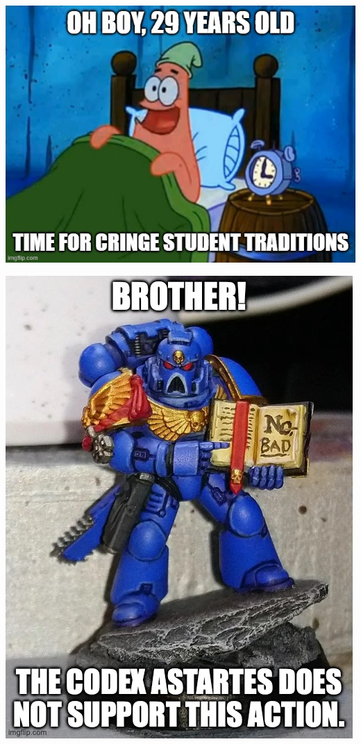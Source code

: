 \documentclass{article}
\title{\vspace{40em}\textbf{\color{white}\Huge{}}}
\date{\vspace{-3em}\color{white}}
\author{}
\begin{document}
\customtitle
\BgThispage
\clearpage

\newpage

\sffamily


\vfill
\includegraphics[width=0.9\linewidth]{images/memes/ohboy.jpg}

\vfill
\newpage

\normalfont
\sitsit
\vfill

\sffamily
\vfill

\includegraphics[width=0.9\linewidth]{images/memes/40k.jpg}
\vfill
\end{document}
